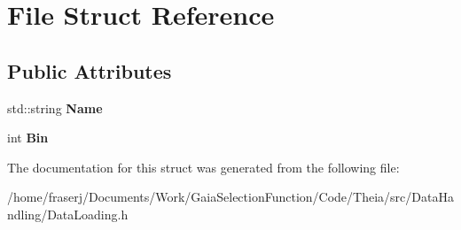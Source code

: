 \hypertarget{structFile}{}\section{File Struct Reference}
\label{structFile}
\subsection*{Public Attributes}
\begin{DoxyCompactItemize}
\item 
\mbox{\label{structFile_afcb65fdfafd4c6373b4c9d3e1ca9459d}} 
std\+::string {\bfseries Name}
\item 
\mbox{\label{structFile_aced9c357d2c770816f23676e0a059d88}} 
int {\bfseries Bin}
\end{DoxyCompactItemize}


The documentation for this struct was generated from the following file\+:\begin{DoxyCompactItemize}
\item 
/home/fraserj/\+Documents/\+Work/\+Gaia\+Selection\+Function/\+Code/\+Theia/src/\+Data\+Handling/Data\+Loading.\+h\end{DoxyCompactItemize}
